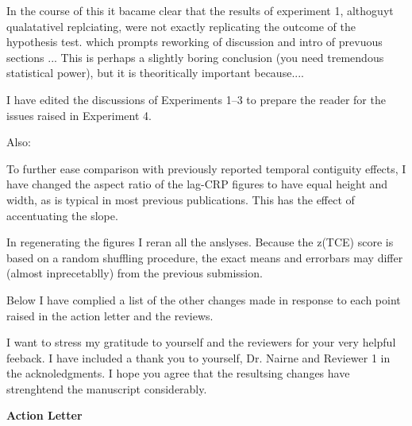 \documentclass[12pt]{article}
\begin{document}
In the course of this it bacame clear that the results of experiment 1, althoguyt qualatativel replciating, were not exactly replicating the outcome of the hypothesis test.  which prompts reworking of discussion and intro of prevuous sections ... This is perhaps a slightly boring conclusion (you need tremendous statistical power), but it is theoritically important because....

I have edited the discussions of Experiments 1--3 to prepare the reader for the issues raised in Experiment 4.


Also:

To further ease comparison with previously reported temporal contiguity effects, I have changed the aspect ratio of the lag-CRP figures to have equal height and width, as is typical in most previous publications. This has the effect of accentuating the slope. 

In regenerating the figures I reran all the anslyses. Because the z(TCE) score is based on a random shuffling procedure, the exact means and errorbars may differ (almost inprecetablly) from the previous submission.


Below I have complied a list of the other changes made in response to each point raised in the action letter and the reviews. 

I want to stress my gratitude to yourself and the reviewers for your very helpful feeback. I have included a thank you to yourself, Dr. Nairne and Reviewer 1 in the acknoledgments. I hope you agree that the resultsing changes have strenghtend the manuscript considerably.

\vspace{20pt}

\textbf{\large{Action Letter}}
\end{document}
